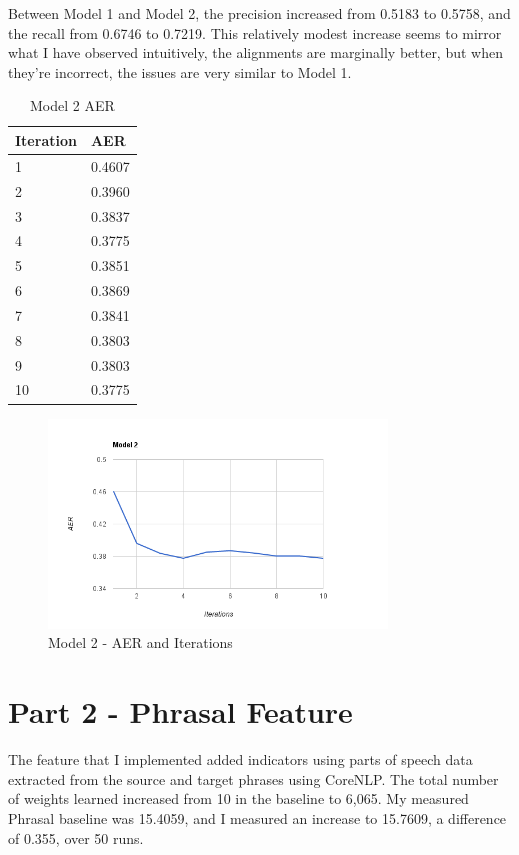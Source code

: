 \documentclass[11pt]{article}
\begin{document}
Between Model 1 and Model 2, the precision increased from 0.5183 to 0.5758, 
and the recall from 0.6746 to 0.7219.  This relatively modest increase seems to mirror what
I have observed intuitively, the alignments are marginally better, but when they're incorrect,
the issues are very similar to Model 1.

\begin{table}
  \begin{center}
    \begin{tabular}{ l l }
      \hline
      Iteration & AER \\
      \hline
        1  & 0.4607 \\
        2  & 0.3960 \\
        3  & 0.3837 \\
        4  & 0.3775 \\
        5  & 0.3851 \\
        6  & 0.3869 \\
        7  & 0.3841 \\
        8  & 0.3803 \\
        9  & 0.3803 \\
        10 & 0.3775 \\
      \hline
    \end{tabular}
  \end{center}
  \caption{Model 2 AER}
  \label{table:model2aer}
\end{table}

\begin{figure}[t]
\includegraphics[width=9cm]{model2}
\centering
\caption{Model 2 - AER and Iterations}
\label{figure:model2aer}
\end{figure}

\section{Part 2 - Phrasal Feature}
 
The feature that I implemented added indicators using parts of speech data
extracted from the source and target phrases using CoreNLP.  The total number of weights
learned increased from 10 in the baseline to 6,065.  My measured Phrasal baseline was 
15.4059, and I measured an increase to 15.7609, a difference of 0.355, over 50 runs.
\end{document}
